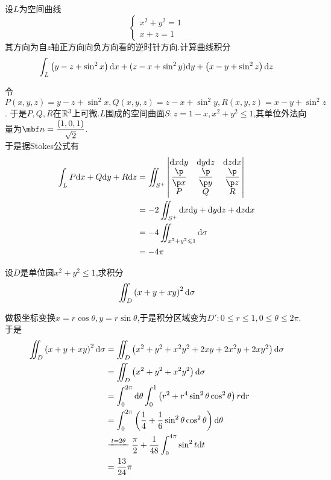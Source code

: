 \documentclass{ctexart}
\begin{document}
\begin{problem}[5.(10\songti{分})]
    设$L$为空间曲线
    \[\left\{\begin{array}{l}
        x^2+y^2=1\\
        x+z=1
    \end{array}\right.\]
    其方向为自$z$轴正方向向负方向看的逆时针方向.计算曲线积分
    \[\int_{L}\left(y-z+\sin^2x\right)\mathrm{d} x+(z-x+\sin^2y)\mathrm{d} y+\left(x-y+\sin^2z\right)\mathrm{d} z\]

\end{problem}
\begin{solution}
    令$P(x,y,z)=y-z+\sin^2x,Q(x,y,z)=z-x+\sin^2y,R(x,y,z)=x-y+\sin^2z$.%
    于是$P,Q,R$在$\mathbb{R}^3$上可微.$L$围成的空间曲面$S:z=1-x,x^2+y^2\leqslant 1$,其单位外法向量为$\mbf n=\dfrac{(1,0,1)}{\sqrt2}$.\\
    于是据Stokes公式有
    \[\begin{aligned}
        \int_LP\di x+Q\di y+R\di z
        &= \iint_{S^+}\begin{vmatrix}
            \di x\di y&\di y\di z&\di z\di x\\
            \dfrac{\p}{\p x}&\dfrac{\p}{\p y}&\dfrac{\p}{\p z}\\
            P&Q&R
        \end{vmatrix}\\
        &= -2\iint_{S^+}\dx\di y+\di y\di z+\di z\di x \\
        &= -4\iint_{x^2+y^2\leqslant 1}\di\sigma \\
        &= -4\pi
    \end{aligned}\]
    
\end{solution}
\begin{problem}[6.(10\songti{分})]
    设$D$是单位圆$x^2+y^2\leqslant1$,求积分
    \[\iint_D\left(x+y+xy\right)^2\mathrm{d}\sigma\]

\end{problem}
\begin{solution}
    做极坐标变换$x=r\cos\theta,y=r\sin\theta$,于是积分区域变为$D':0\leqslant r\leqslant 1,0\leqslant\theta\leqslant2\pi$.于是
    \[\begin{aligned}
        \iint_{D}\left(x+y+xy\right)^2\di\sigma
        &= \iint_{D}\left(x^2+y^2+x^2y^2+2xy+2x^2y+2xy^2\right)\di\sigma \\
        &= \iint_{D}\left(x^2+y^2+x^2y^2\right)\di\sigma \\
        &= \int_0^{2\pi}\di\theta\int_0^1\left(r^2+r^4\sin^2\theta\cos^2\theta\right)r\di r \\
        &= \int_0^{2\pi}\left(\dfrac14+\dfrac16\sin^2\theta\cos^2\theta\right)\di\theta \\
        &\xlongequal{t=2\theta} \dfrac\pi2+\dfrac{1}{48}\int_0^{4\pi}\sin^2 t\di t \\
        &= \dfrac{13}{24}\pi
    \end{aligned}\]
\end{solution}
\end{document}
